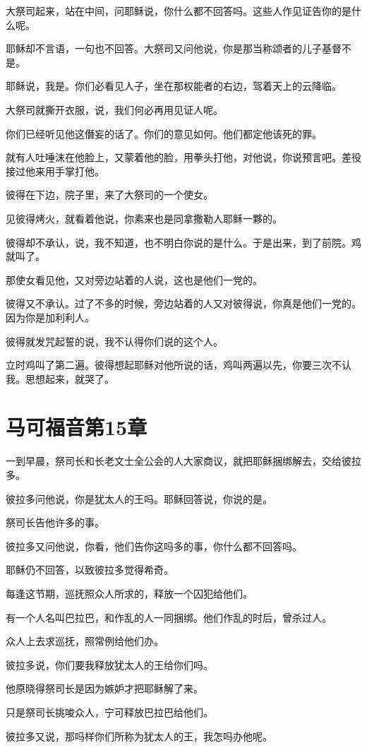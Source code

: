 \documentclass[12pt,oneside]{book}
\begin{document}
大祭司起来，站在中间，问耶稣说，你什么都不回答吗。这些人作见证告你的是什么呢。

耶稣却不言语，一句也不回答。大祭司又问他说，你是那当称颂者的儿子基督不是。

耶稣说，我是。你们必看见人子，坐在那权能者的右边，驾着天上的云降临。

大祭司就撕开衣服，说，我们何必再用见证人呢。

你们已经听见他这僭妄的话了。你们的意见如何。他们都定他该死的罪。

就有人吐唾沫在他脸上，又蒙着他的脸，用拳头打他，对他说，你说预言吧。差役接过他来用手掌打他。

彼得在下边，院子里，来了大祭司的一个使女。

见彼得烤火，就看着他说，你素来也是同拿撒勒人耶稣一夥的。

彼得却不承认，说，我不知道，也不明白你说的是什么。于是出来，到了前院。鸡就叫了。

那使女看见他，又对旁边站着的人说，这也是他们一党的。

彼得又不承认。过了不多的时候，旁边站着的人又对彼得说，你真是他们一党的。因为你是加利利人。

彼得就发咒起誓的说，我不认得你们说的这个人。

立时鸡叫了第二遍。彼得想起耶稣对他所说的话，鸡叫两遍以先，你要三次不认我。思想起来，就哭了。

\chapter{马可福音第15章}
一到早晨，祭司长和长老文士全公会的人大家商议，就把耶稣捆绑解去，交给彼拉多。

彼拉多问他说，你是犹太人的王吗。耶稣回答说，你说的是。

祭司长告他许多的事。

彼拉多又问他说，你看，他们告你这吗多的事，你什么都不回答吗。

耶稣仍不回答，以致彼拉多觉得希奇。

每逢这节期，巡抚照众人所求的，释放一个囚犯给他们。

有一个人名叫巴拉巴，和作乱的人一同捆绑。他们作乱的时后，曾杀过人。

众人上去求巡抚，照常例给他们办。

彼拉多说，你们要我释放犹太人的王给你们吗。

他原晓得祭司长是因为嫉妒才把耶稣解了来。

只是祭司长挑唆众人，宁可释放巴拉巴给他们。

彼拉多又说，那吗样你们所称为犹太人的王，我怎吗办他呢。
\end{document}
